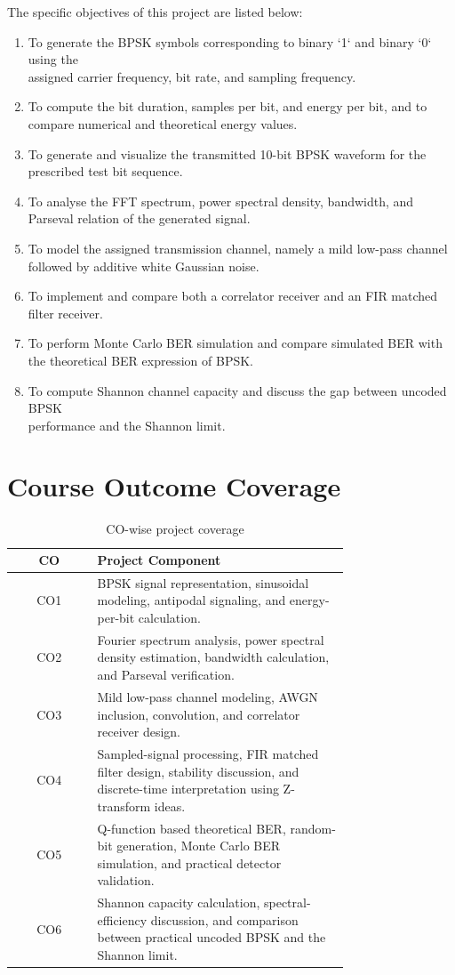 The specific objectives of this project are listed below:
\begin{enumerate}[label=\arabic*.]
    \item To generate the BPSK symbols corresponding to binary `1` and binary `0` using the \\assigned carrier frequency, bit rate, and sampling frequency.
    \item To compute the bit duration, samples per bit, and energy per bit, and to compare numerical and theoretical energy values.
    \item To generate and visualize the transmitted 10-bit BPSK waveform for the prescribed test bit sequence.
    \item To analyse the FFT spectrum, power spectral density, bandwidth, and Parseval relation of the generated signal.
    \item To model the assigned transmission channel, namely a mild low-pass channel followed by additive white Gaussian noise.
    \item To implement and compare both a correlator receiver and an FIR matched filter receiver.
    \item To perform Monte Carlo BER simulation and compare simulated BER with the theoretical BER expression of BPSK.
    \item To compute Shannon channel capacity and discuss the gap between uncoded BPSK \\performance and the Shannon limit.
\end{enumerate}

\section{Course Outcome Coverage}

\begin{table}[H]
\centering
\caption{CO-wise project coverage}
\begin{tabular}{|c|p{0.75\linewidth}|}
\hline
\textbf{CO} & \textbf{Project Component} \\
\hline
CO1 & BPSK signal representation, sinusoidal modeling, antipodal signaling, and energy-per-bit calculation. \\
\hline
CO2 & Fourier spectrum analysis, power spectral density estimation, bandwidth calculation, and Parseval verification. \\
\hline
CO3 & Mild low-pass channel modeling, AWGN inclusion, convolution, and correlator receiver design. \\
\hline
CO4 & Sampled-signal processing, FIR matched filter design, stability discussion, and discrete-time interpretation using Z-transform ideas. \\
\hline
CO5 & Q-function based theoretical BER, random-bit generation, Monte Carlo BER simulation, and practical detector validation. \\
\hline
CO6 & Shannon capacity calculation, spectral-efficiency discussion, and comparison between practical uncoded BPSK and the Shannon limit. \\
\hline
\end{tabular}
\end{table}